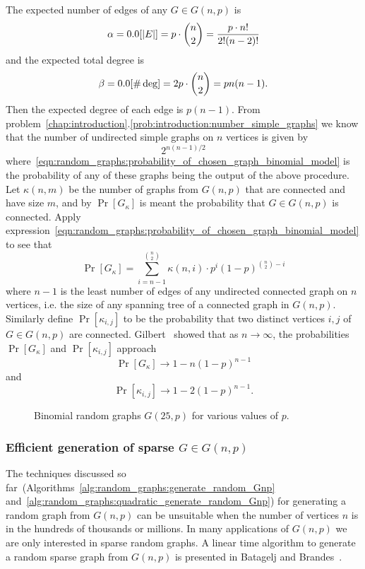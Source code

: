 The expected number of edges of any $G \in G(n,p)$ is
\[
\alpha
=
\E[|E|]
=
p \cdot \binom{n}{2}
=
\frac{p \cdot n!} {2! (n - 2)!}
\]
and the expected total degree is
\[
\beta
=
\E[\#\deg]
=
2p \cdot \binom{n}{2}
=
pn(n - 1).
\]
Then the expected degree of each edge is $p(n - 1)$. From
problem~\ref{chap:introduction}.\ref{prob:introduction:number_simple_graphs}
we know that the number of undirected simple graphs on $n$ vertices is
given by
\[
2^{n(n-1) / 2}
\]
where~\eqref{eqn:random_graphs:probability_of_chosen_graph_binomial_model}
is the probability of any of these graphs being the output of the
above procedure. Let $\kappa(n,m)$ be the number of graphs from
$G(n,p)$ that are connected and have size $m$, and by $\Pr[G_\kappa]$
is meant the probability that $G \in G(n,p)$ is connected. Apply
expression~\eqref{eqn:random_graphs:probability_of_chosen_graph_binomial_model}
to see that
\[
\Pr[G_\kappa]
=
\sum_{i=n-1}^{\binom{n}{2}}
\kappa(n,i) \cdot p^i (1 - p)^{\binom{n}{2} - i}
\]
where $n - 1$ is the least number of edges of any undirected connected
graph on $n$ vertices, i.e. the size of any spanning tree of a
connected graph in $G(n,p)$. Similarly define $\Pr[\kappa_{i,j}]$ to
be the probability that two distinct vertices $i,j$ of
$G \in G(n,p)$ are connected. Gilbert~\cite{Gilbert1959} showed that
as $n \to \infty$, the probabilities $\Pr[G_\kappa]$ and
$\Pr[\kappa_{i,j}]$ approach
\[
\Pr[G_\kappa] \to 1 - n(1 - p)^{n-1}
\]
and
\[
\Pr[\kappa_{i,j}] \to 1 - 2(1 - p)^{n-1}.
\]

\begin{figure}[!htbp]
\centering
{}

\caption{Binomial random graphs $G(25,p)$ for various values of $p$.}
\label{fig:random_graphs:binomial_random_graph_25_nodes}
\end{figure}



\subsubsection{Efficient generation of sparse $G \in G(n,p)$}

The techniques discussed so
far~(Algorithms~\ref{alg:random_graphs:generate_random_Gnp}
and~\ref{alg:random_graphs:quadratic_generate_random_Gnp}) for
generating a random graph from $G(n,p)$ can be unsuitable when the
number of vertices $n$ is in the hundreds of thousands or millions. In
many applications of $G(n,p)$ we are only interested in
sparse random graphs. A linear time algorithm to
generate a random sparse graph from $G(n,p)$ is presented in
Batagelj and
Brandes~\cite{BatageljBrandes2005}.

